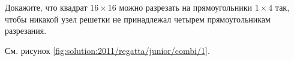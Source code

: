 \problem
Докажите, что квадрат $16 \times 16$ можно разрезать на прямоугольники
$1 \times 4$ так, чтобы никакой узел решетки не принадлежал четырем
прямоугольникам разрезания.


%
\label{solution:2011/regatta/junior/combi/1}%
См. рисунок \ref{fig:solution:2011/regatta/junior/combi/1}.

\endproblem
